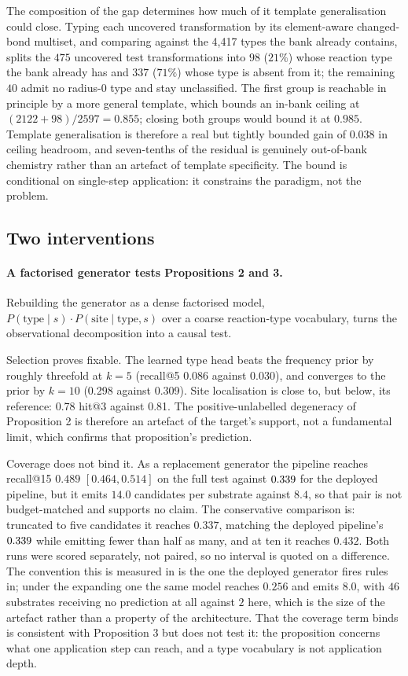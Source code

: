 The composition of the gap determines how much of it template generalisation could close. Typing
each uncovered transformation by its element-aware changed-bond multiset, and comparing against
the 4{,}417 types the bank already contains, splits the $475$ uncovered test transformations into
$98$ ($21\%$) whose reaction type the bank already has and $337$ ($71\%$) whose type is
absent from it; the remaining $40$ admit no radius-0 type and stay unclassified. The first group is reachable in principle by a more general template, which
bounds an in-bank ceiling at $(2122+98)/2597 = 0.855$; closing both groups would bound it at
$0.985$. Template generalisation is therefore a real but tightly bounded gain of $0.038$ in ceiling
headroom, and seven-tenths of the residual is genuinely out-of-bank chemistry rather than an
artefact of template specificity. The bound is conditional on single-step application: it
constrains the paradigm, not the problem.

\subsection{Two interventions}

\paragraph{A factorised generator tests Propositions 2 and 3.}
Rebuilding the generator as a dense factorised model, $P(\text{type}\mid s)\cdot
P(\text{site}\mid \text{type},s)$ over a coarse reaction-type vocabulary, turns the observational
decomposition into a causal test.

Selection proves fixable. The learned type head beats the frequency prior by roughly threefold at
$k=5$ (recall@5 0.086 against 0.030), and converges to the prior by $k=10$ (0.298 against 0.309). Site localisation is close to, but below, its reference: 0.78 hit@3 against 0.81. The positive-unlabelled degeneracy of Proposition 2 is
therefore an artefact of the target's support, not a fundamental limit, which confirms that
proposition's prediction.

Coverage does not bind it. As a replacement generator the pipeline reaches recall@15 $0.489$
$[0.464,0.514]$ on the full test against $0.339$ for the deployed pipeline, but it emits
$14.0$ candidates per substrate against $8.4$, so that pair is not budget-matched and supports no claim. The conservative comparison is: truncated to five candidates it reaches $0.337$, matching
the deployed pipeline's $0.339$ while emitting fewer than half as many, and at ten it reaches
$0.432$. Both runs were scored separately, not paired, so no interval is quoted on a
difference. The convention this is measured in is the one the deployed generator fires rules in;
under the expanding one the same model reaches $0.256$ and emits $8.0$, with $46$ substrates
receiving no prediction at all against $2$ here, which is the size of the artefact rather than a
property of the architecture. That the coverage term binds is consistent with Proposition 3 but does not test it: the
proposition concerns what one application step can reach, and a type vocabulary is not application
depth.

